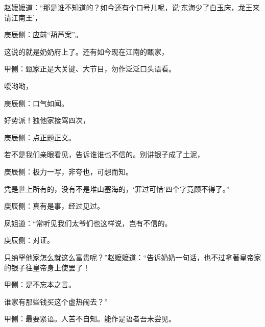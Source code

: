 \begin{parag}
    赵嬷嬷道：“那是谁不知道的？如今还有个口号儿呢，说‘东海少了白玉床，龙王来请江南王’，\begin{note}庚辰侧：应前“葫芦案”。\end{note}这说的就是奶奶府上了。还有如今现在江南的甄家，\begin{note}甲侧：甄家正是大关键、大节目，勿作泛泛口头语看。\end{note}嗳哟哟，\begin{note}庚辰侧：口气如闻。\end{note}好势派！独他家接驾四次，\begin{note}庚辰侧：点正题正文。\end{note}若不是我们亲眼看见，告诉谁谁也不信的。别讲银子成了土泥，\begin{note}庚辰侧：极力一写，非夸也，可想而知。\end{note}凭是世上所有的，没有不是堆山塞海的，‘罪过可惜’四个字竟顾不得了。”\begin{note}庚辰侧：真有是事，经过见过。\end{note}凤姐道：“常听见我们太爷们也这样说，岂有不信的。\begin{note}庚辰侧：对证。\end{note}只纳罕他家怎么就这么富贵呢？”赵嬷嬷道：“告诉奶奶一句话，也不过拿著皇帝家的银子往皇帝身上使罢了！\begin{note}甲侧：是不忘本之言。\end{note}谁家有那些钱买这个虚热闹去？”\begin{note}甲侧：最要紧语。人苦不自知。能作是语者吾未尝见。\end{note}
\end{parag}


